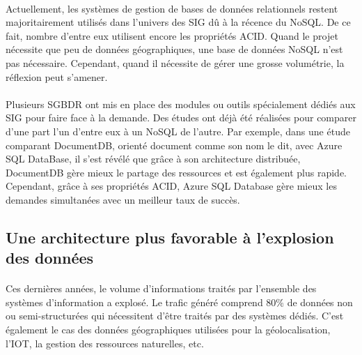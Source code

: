 \paragraph{}Actuellement, les systèmes de gestion de bases de données relationnels restent majoritairement utilisés dans l’univers des SIG dû à la récence du NoSQL. De ce fait, nombre d’entre eux utilisent encore les propriétés ACID. Quand le projet nécessite que peu de données géographiques, une base de données NoSQL n’est pas nécessaire. Cependant, quand il nécessite de gérer une grosse volumétrie, la réflexion peut s’amener.
\paragraph{}Plusieurs SGBDR ont mis en place des modules ou outils spécialement dédiés aux SIG pour faire face à la demande. Des études ont déjà été réalisées pour comparer d’une part l’un d’entre eux à un NoSQL de l’autre. Par exemple, dans une étude comparant DocumentDB, orienté document comme son nom le dit, avec Azure SQL DataBase\supercite{azuredocumentdb}, il s’est révélé que grâce à son architecture distribuée, DocumentDB gère mieux le partage des ressources et est également plus rapide. Cependant, grâce à ses propriétés ACID, Azure SQL Database gère mieux les demandes simultanées avec un meilleur taux de succès.

\subsection{Une architecture plus favorable à l’explosion des données}

\paragraph{}Ces dernières années, le volume d’informations traités par l’ensemble des systèmes d’information a explosé. Le trafic généré comprend 80\% de données non ou semi-structurées qui nécessitent d’être traités par des systèmes dédiés. C’est également le cas des données géographiques utilisées pour la géolocalisation, l’IOT, la gestion des ressources naturelles, etc. 

